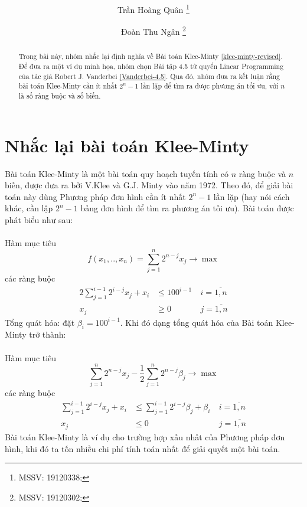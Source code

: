 \documentclass[12pt]{article}
\title{\textbf{\reportname}}
\author{Trần Hoàng Quân%
  \thanks{MSSV: 19120338;}}
\affil{Trường Đại học Khoa học Tự nhiên, ĐHQG-HCM}
\author{Đoàn Thu Ngân%
  \thanks{MSSV: 19120302;}}
\affil{Trường Đại học Khoa học Tự nhiên, ĐHQG-HCM}
\begin{document}
\maketitle

\begin{abstract}
Trong bài này, nhóm nhắc lại định nghĩa về Bài toán Klee-Minty \ref{klee-minty-revised}. Để đưa ra một ví dụ minh họa, nhóm chọn Bài tập 4.5 từ quyển Linear Programming của tác giả Robert J. Vanderbei \ref{Vanderbei-4.5}. Qua đó, nhóm đưa ra kết luận rằng bài toán Klee-Minty cần ít nhất $2^n - 1$ lần lặp để tìm ra được phương án tối ưu, với $n$ là số ràng buộc và số biến.
\end{abstract}

\section{Nhắc lại bài toán Klee-Minty}\label{klee-minty-revised}
Bài toán Klee-Minty là một bài toán quy hoạch tuyến tính có $n$ ràng buộc và $n$ biến, được đưa ra bởi V.Klee và G.J. Minty vào năm 1972\cite{Vanderbei2020}. Theo đó, để giải bài toán này dùng Phương pháp đơn hình cần ít nhất $2^{n} - 1$ lần lặp (hay nói cách khác, cần lập $2^{n} - 1$ bảng đơn hình để tìm ra phương án tối ưu). Bài toán được phát biểu như sau:\\\\
Hàm mục tiêu
$$
f(x_1, .., x_n) = \sum_{j = 1}^n 2^{n - j}x_j \rightarrow \max
$$
các ràng buộc
\begin{equation*}
\begin{aligned}
2\sum_{j = 1}^{i - 1} 2^{i - j}x_j + x_i &\leq 100^{i - 1}\ &i = \overline{1, n}\\
x_j &\geq 0\ &j = \overline{1, n}
\end{aligned}
\end{equation*}
Tổng quát hóa: đặt $\beta_i = 100^{i - 1}$. Khi đó dạng tổng quát hóa của Bài toán Klee-Minty trở thành:\\\\
Hàm mục tiêu
$$
\sum_{j = 1}^n 2^{n - j}x_j - \frac{1}{2}\sum_{j = 1}^{n} 2^{n - j}\beta_j \rightarrow \max
$$
các ràng buộc
\begin{equation*}
\begin{aligned}
\sum_{j = 1}^{i - 1} 2^{i - j} x_j + x_i &\leq \sum_{j = 1}^{i - 1} 2^{i - j} \beta_j + \beta_i\ &i = \overline{1, n}\\
x_j &\leq 0\ &j = \overline{1, n}
\end{aligned}
\end{equation*}
Bài toán Klee-Minty là ví dụ cho trường hợp xấu nhất của Phương pháp đơn hình, khi đó ta tốn nhiều chi phí tính toán nhất để giải quyết một bài toán.
\end{document}
